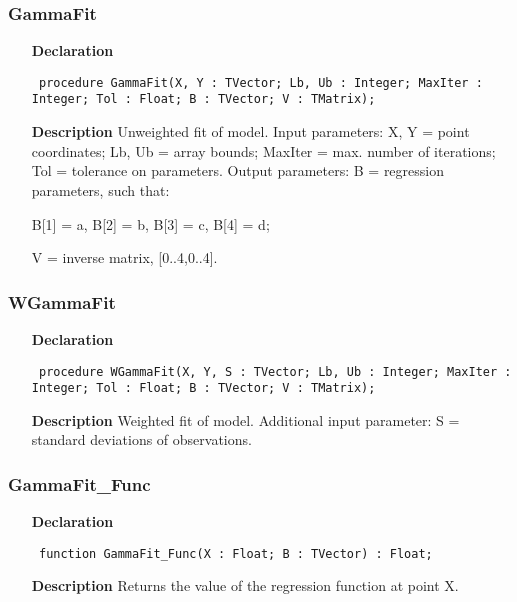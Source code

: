 \documentclass[12pt,a4paper,oneside]{report}
\newcommand{\declarationitem}[1]{\textbf{#1}}
\newcommand{\descriptiontitle}[1]{\textbf{#1}}
\newcommand{\code}[1]{\texttt{#1}}
\begin{document}
\subsubsection{GammaFit}
\label{ugamfit-GammaFit}
\begin{itemize}\item[\declarationitem{Declaration}\hfill]
	\begin{flushleft}
		\code{
			procedure GammaFit(X, Y : TVector; Lb, Ub : Integer; MaxIter : Integer; Tol : Float; B : TVector; V : TMatrix);}
		
	\end{flushleft}
	
	\par
	\item[\descriptiontitle{Description}]
	Unweighted fit of model. Input parameters: X, Y = point coordinates; Lb, Ub = array bounds; MaxIter = max. number of iterations; Tol = tolerance on parameters. Output parameters: B = regression parameters, such that:
	
	B[1] = a, B[2] = b, B[3] = c, B[4] = d; 
	
	V = inverse matrix, [0..4,0..4].
	
\end{itemize}
\subsubsection{WGammaFit}
\label{ugamfit-WGammaFit}
\begin{itemize}\item[\declarationitem{Declaration}\hfill]
	\begin{flushleft}
		\code{
			procedure WGammaFit(X, Y, S : TVector; Lb, Ub : Integer; MaxIter : Integer; Tol : Float; B : TVector; V : TMatrix);}
		
	\end{flushleft}
	
	\par
	\item[\descriptiontitle{Description}]
	Weighted fit of model. Additional input parameter: S = standard deviations of observations.
	
\end{itemize}
\subsubsection{GammaFit{\_}Func}
\label{ugamfit-GammaFit_Func}
\begin{itemize}\item[\declarationitem{Declaration}\hfill]
	\begin{flushleft}
		\code{
			function GammaFit{\_}Func(X : Float; B : TVector) : Float;}
		
	\end{flushleft}
	
	\par
	\item[\descriptiontitle{Description}]
	Returns the value of the regression function at point X.
	
\end{itemize}
\end{document}
